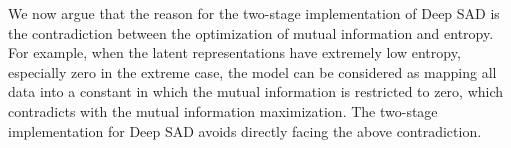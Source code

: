 \documentclass{bmvc2k}
\begin{document}
We now argue that the reason for the two-stage implementation of Deep SAD is the contradiction between the optimization of mutual information and entropy. For example, when the latent representations have extremely low entropy, especially zero in the extreme case, the model can be considered as mapping all data into a constant in which the mutual information is restricted to zero, which contradicts with the mutual information maximization. The two-stage implementation for Deep SAD avoids directly facing the above contradiction. 

\renewcommand \arraystretch{0.8}
\begin{table}[h]
  \centering
  \scriptsize
  \caption{Model Structure of ESAD.}
  \label{tal:esad}
\end{table}
\end{document}
